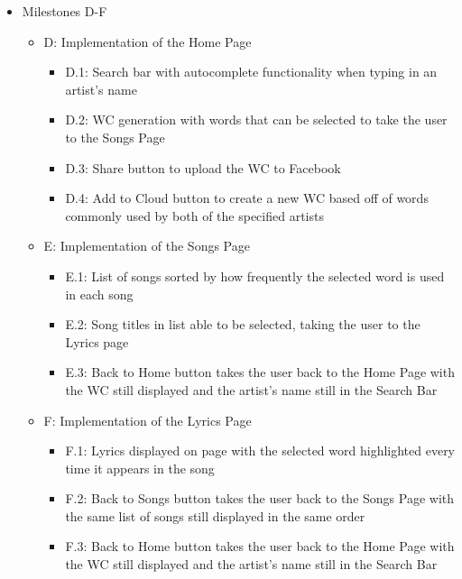 \documentclass[]{article}
\begin{document}
\begin{itemize}
\itemsep1pt\parskip0pt
\item
  Milestones D-F

  \begin{itemize}
  \itemsep1pt\parskip0pt
  \item
    D: Implementation of the Home Page

    \begin{itemize}
    \itemsep1pt\parskip0pt
    \item
      D.1: Search bar with autocomplete functionality when typing in an
      artist's name
    \item
      D.2: WC generation with words that can be selected to take the
      user to the Songs Page
    \item
      D.3: Share button to upload the WC to Facebook
    \item
      D.4: Add to Cloud button to create a new WC based off of words
      commonly used by both of the specified artists
    \end{itemize}
  \item
    E: Implementation of the Songs Page

    \begin{itemize}
    \itemsep1pt\parskip0pt
    \item
      E.1: List of songs sorted by how frequently the selected word is
      used in each song
    \item
      E.2: Song titles in list able to be selected, taking the user to
      the Lyrics page
    \item
      E.3: Back to Home button takes the user back to the Home Page with
      the WC still displayed and the artist's name still in the Search
      Bar
    \end{itemize}
  \item
    F: Implementation of the Lyrics Page

    \begin{itemize}
    \itemsep1pt\parskip0pt
    \item
      F.1: Lyrics displayed on page with the selected word highlighted
      every time it appears in the song
    \item
      F.2: Back to Songs button takes the user back to the Songs Page
      with the same list of songs still displayed in the same order
    \item
      F.3: Back to Home button takes the user back to the Home Page with
      the WC still displayed and the artist's name still in the Search
      Bar
    \end{itemize}
  \end{itemize}
\end{itemize}
\end{document}
